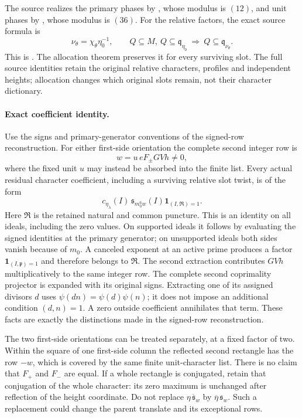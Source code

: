 The source realizes the primary phases by
, whose modulus is $(12)$, and unit
phases by , whose modulus is $(36)$.
For the relative factors, the exact source formula is
\[
 \nu_\theta=\chi_\theta\eta_0^{-1},\qquad
 Q\subseteq M,\ Q\subseteq\mathfrak q_{\eta_0}
 \ \Longrightarrow\ Q\subseteq\mathfrak q_{\nu_\theta}.
\]
This is .
The allocation theorem 
preserves it for every surviving slot. The full source identities
 retain the original relative characters,
profiles and independent heights; allocation changes which original slots
remain, not their character dictionary.

\paragraph{Exact coefficient identity.}
Use the signs and primary-generator conventions of the signed-row
reconstruction. For either first-side orientation the complete second
integer row is
\[
 w=u\,eF_{\pm}GVh\ne0,
\]
where the fixed unit $u$ may instead be absorbed into the finite list.
Every actual residual character coefficient, including a surviving
relative slot twist, is of the form
\[
 c_{\eta_\lambda}(I)\,\mathfrak s_{m_0^6w}(I)
       \mathbf1_{(I,\mathfrak R)=1}.                 \tag{FD}
\]
Here $\mathfrak R$ is the retained natural and common puncture. This is an
identity on all ideals, including the zero values. On supported ideals
it follows by evaluating the signed identities at the primary generator;
on unsupported ideals both sides vanish because of $m_0$. A canceled
exponent at an active prime produces a factor
$\mathbf1_{(I,\mathfrak p)=1}$ and therefore belongs to $\mathfrak R$.
The second extraction contributes $GVh$ multiplicatively to the same
integer row. The complete second coprimality projector is expanded with
its original signs. Extracting one of its assigned divisors $d$ uses
$\psi(dn)=\psi(d)\psi(n)$; it does not impose an additional condition
$(d,n)=1$. A zero outside coefficient annihilates that term. These facts
are exactly the distinctions made in the signed-row reconstruction.

The two first-side orientations can be treated separately, at a fixed
factor of two. Within the square of one first-side column the reflected
second rectangle has the row $-w$, which is covered by the same finite
unit-character list. There is no claim that $F_+$ and $F_-$ are equal.
If a whole rectangle is conjugated, retain that conjugation of the whole
character: its zero maximum is unchanged after reflection of the height
coordinate. Do not replace $\overline{\eta\,\mathfrak s_w}$ by
$\overline\eta\,\mathfrak s_w$. Such a replacement could change the
parent translate and its exceptional rows.

